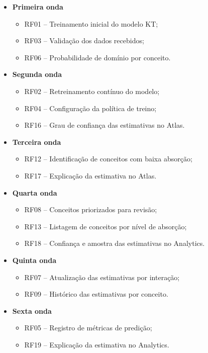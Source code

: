 \begin{itemize}
    \item \textbf{Primeira onda}
    \begin{itemize}
        \item RF01 -- Treinamento inicial do modelo KT;
        \item RF03 -- Validação dos dados recebidos;
        \item RF06 -- Probabilidade de domínio por conceito.
    \end{itemize}
    \item \textbf{Segunda onda}
    \begin{itemize}
        \item RF02 -- Retreinamento contínuo do modelo;
        \item RF04 -- Configuração da política de treino;
        \item RF16 -- Grau de confiança das estimativas no Atlas.
    \end{itemize}
    \item \textbf{Terceira onda}
    \begin{itemize}
        \item RF12 -- Identificação de conceitos com baixa absorção;
        \item RF17 -- Explicação da estimativa no Atlas.
    \end{itemize}
    \item \textbf{Quarta onda}
    \begin{itemize}
        \item RF08 -- Conceitos priorizados para revisão;
        \item RF13 -- Listagem de conceitos por nível de absorção;
        \item RF18 -- Confiança e amostra das estimativas no Analytics.
    \end{itemize}
    \item \textbf{Quinta onda}
    \begin{itemize}
        \item RF07 -- Atualização das estimativas por interação;
        \item RF09 -- Histórico das estimativas por conceito.
    \end{itemize}
    \item \textbf{Sexta onda}
    \begin{itemize}
        \item RF05 -- Registro de métricas de predição;
        \item RF19 -- Explicação da estimativa no Analytics.

\end{itemize}
\end{itemize}
